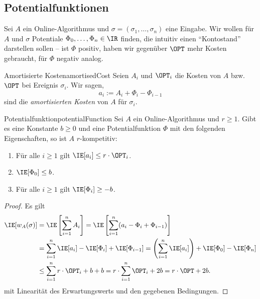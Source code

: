 \documentclass[language=ngerman,algolist]{TemplateLecture}
\begin{document}
\subsection{Potentialfunktionen}

Sei $A$ ein Online-Algorithmus und $\sigma = (\sigma_1, \ldots, \sigma_n)$ eine Eingabe. Wir wollen für $A$ und $\sigma$ Potentiale $\Phi_0, \ldots, \Phi_n \in \IR$ finden, die intuitiv einen \enquote{Kontostand} darstellen sollen -- ist $\Phi$ positiv, haben wir gegenüber $\OPT$ mehr Kosten gebraucht, für $\Phi$ negativ analog.

\begin{defi}{Amortisierte Kosten}{amortisedCost}
    Seien $A_i$ und $\OPT_i$ die Kosten von $A$ bzw. $\OPT$ bei Ereignis $\sigma_i$. Wir sagen,
    \begin{equation*}
        a_i := A_i + \Phi_i - \Phi_{i-1}
    \end{equation*}
    sind die \emph{amortisierten Kosten} von $A$ für $\sigma_i$.
\end{defi}

\begin{thm}{Potentialfunktion}{potentialFunction}
    Sei $A$ ein Online-Algorithmus und $r \geq 1$. Gibt es eine Konstante $b \geq 0$ und eine Potentialfunktion $\Phi$ mit den folgenden Eigenschaften, so ist $A$ $r$-kompetitiv:
    \begin{enumerate}
        \item Für alle $i \geq 1$ gilt $\IE[a_i] \leq r \cdot \OPT_i$.
        \item $\IE[\Phi_0] \leq b$.
        \item Für alle $i \geq 1$ gilt $\IE[\Phi_i] \geq -b$.
    \end{enumerate}
\end{thm}

\begin{proof}
    Es gilt 
    \begin{equation*}
        \begin{split}
            \IE[w_A(\sigma)] &= \IE\left[ \sum_{i = 1}^n A_i \right] = \IE\left[ \sum_{i = 1}^n (a_i - \Phi_i + \Phi_{i-1}) \right]  \\
                             &= \sum_{i = 1}^n \IE[a_i] - \IE[\Phi_i] + \IE[\Phi_{i-1}] = \left(\sum_{i = 1}^n \IE[a_i]\right) + \IE[\Phi_0] - \IE[\Phi_n] \\
                             &\leq \sum_{i = 1}^n r \cdot \OPT_i + b + b = r \cdot \sum_{i = 1}^n \OPT_i + 2b = r \cdot \OPT + 2b.
        \end{split}
    \end{equation*}
    mit Linearität des Erwartungswerts und den gegebenen Bedingungen.
\end{proof}
\end{document}

